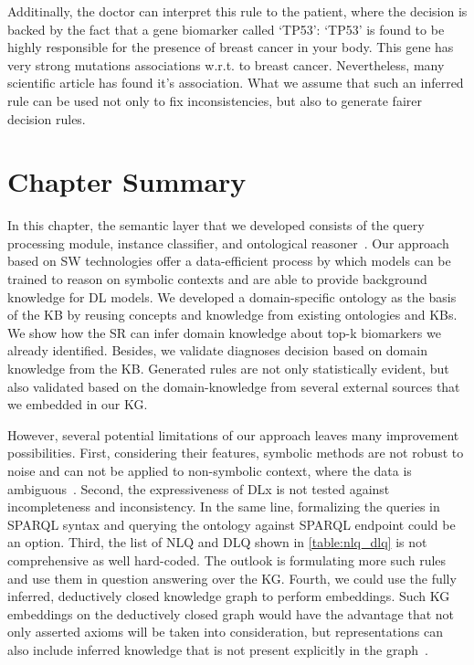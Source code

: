 \hspace*{3.5mm} Additinally, the doctor can interpret this rule to the patient, where the decision is backed by the fact that a gene biomarker called `TP53': `TP53' is found to be highly responsible for the presence of breast cancer in your body. This gene has very strong mutations associations w.r.t. to breast cancer. Nevertheless, many scientific article has found it's association. What we assume that such an inferred rule can be used not only to fix inconsistencies, but also to generate fairer decision rules. 

\section{Chapter Summary}\label{chapter_8:conclusion}
In this chapter, the semantic layer that we developed consists of the query processing module, instance classifier, and ontological reasoner~\cite{futia2020integration}. Our approach based on SW technologies offer a data-efficient process by which models can be trained to reason on symbolic contexts and are able to provide background knowledge for DL models. We developed a domain-specific ontology as the basis of the KB by reusing concepts and knowledge from existing ontologies and KBs. We show how the SR can infer domain knowledge about top-k biomarkers we already identified. 
Besides, we validate diagnoses decision based on domain knowledge from the KB. 
Generated rules are not only statistically evident, but also validated based on the domain-knowledge from several external sources that we embedded in our KG. 

\hspace*{3.5mm} However, several potential limitations of our approach leaves many improvement possibilities. First, considering their features, symbolic methods are not robust to noise and can not be applied to non-symbolic context, where the data is ambiguous~\cite{futia2020integration}. Second, the expressiveness of DLx is not tested against incompleteness and inconsistency. In the same line, formalizing the queries in SPARQL syntax and querying the ontology against SPARQL endpoint could be an option. Third, the list of NLQ and DLQ shown in \cref{table:nlq_dlq} is not comprehensive as well hard-coded. The outlook is formulating more such rules and use them in question answering over the KG. Fourth, we could use the fully inferred, deductively closed knowledge graph to perform  embeddings. Such KG embeddings on the deductively closed graph would have  the advantage that not only asserted axioms will be taken into consideration, but representations can also include inferred knowledge that is not present explicitly in the graph~\cite{alshahrani2017neuro}. 

